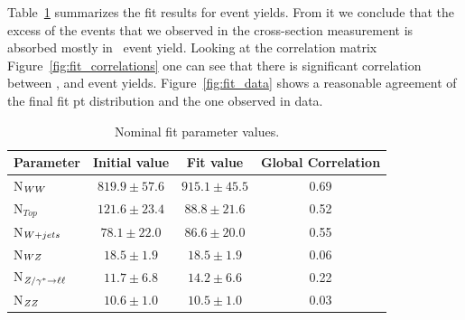Table~\ref{tab:fit_yields} summarizes the fit results for event
yields. From it we conclude that the excess of the events that we
observed in the cross-section measurement is absorbed mostly in \ww\
event yield. Looking at the correlation matrix
Figure~\ref{fig:fit_correlations} one can see that there is
significant correlation between \ww{}, \wjets{} and \ttbar{} event
yields. Figure~\ref{fig:fit_data} shows a reasonable agreement of the
final fit pt distribution and the one observed in data. 



\begin{table}[!ht]
  \begin{center}
 {\small
  \begin{tabular} {|l|c|c|c|}
\hline
  Parameter       &   Initial value & Fit value & Global Correlation \\
\hline
  N$_{WW}$       & $819.9\pm57.6$  & $915.1\pm45.5$ & 0.69 \\
  N$_{Top}$       & $121.6\pm23.4$  & $88.8\pm21.6$  & 0.52 \\
  N$_{W+jets}$    & $78.1\pm22.0$   & $86.6\pm20.0$ & 0.55 \\
  N$_{WZ}$       & $18.5\pm1.9$    & $18.5\pm1.9$   & 0.06 \\
  N$_{Z/\gamma^*\to\ell\ell}$     & $11.7\pm6.8$    & $14.2\pm6.6$   & 0.22 \\
  N$_{ZZ}$       & $10.6\pm1.0$    & $10.5\pm1.0$   & 0.03 \\
\hline
  \end{tabular}
  }
  \caption{Nominal fit parameter values.}
   \label{tab:fit_yields}
  \end{center}
\end{table}

